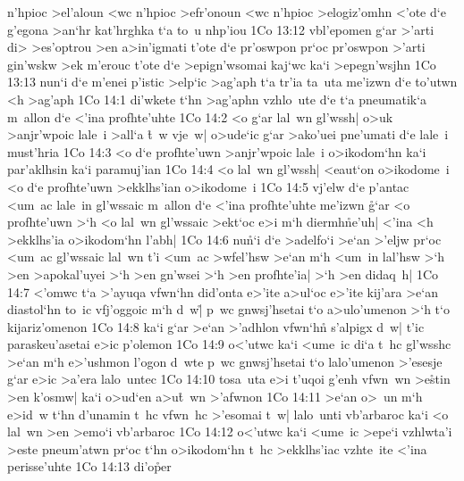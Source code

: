 n'hpioc
>el'aloun
<wc
n'hpioc
>efr'onoun
<wc
n'hpioc
>elogiz'omhn
<'ote
d`e
g'egona
>an`hr
kat'hrghka
t`a
to~u
nhp'iou\bibvsend
\vs 1Co 13:12
vbl'epomen
g`ar
>'arti
di>
>es'optrou
>en
a>in'igmati
t'ote
d`e
pr'oswpon
pr`oc
pr'oswpon
>'arti
gin'wskw
>ek
m'erouc
t'ote
d`e
>epign'wsomai
kaj`wc
ka`i
>epegn'wsjhn\bibvsend
\vs 1Co 13:13
nun`i
d`e
m'enei
p'istic
>elp`ic
>ag'aph
t`a
tr'ia
ta~uta
me'izwn
d`e
to'utwn
<h
>ag'aph\bibvsend
\vs 1Co 14:1
di'wkete
t`hn
>ag'aphn
vzhlo~ute
d`e
t`a
pneumatik`a
m~allon
d`e
<'ina
profhte'uhte\bibvsend
\vs 1Co 14:2
<o
g`ar
lal~wn
gl'wssh|
o>uk
>anjr'wpoic
lale~i
>all`a
\r{t}~w
vje~w|
o>ude`ic
g`ar
>ako'uei
pne'umati
d`e
lale~i
must'hria\bibvsend
\vs 1Co 14:3
<o
d`e
profhte'uwn
>anjr'wpoic
lale~i
o>ikodom`hn
ka`i
par'aklhsin
ka`i
paramuj'ian\bibvsend
\vs 1Co 14:4
<o
lal~wn
gl'wssh|
<eaut`on
o>ikodome~i
<o
d`e
profhte'uwn
>ekklhs'ian
o>ikodome~i\bibvsend
\vs 1Co 14:5
vj'elw
d`e
p'antac
<um~ac
lale~in
gl'wssaic
m~allon
d`e
<'ina
profhte'uhte
me'izwn
\r{g}`ar
<o
profhte'uwn
>`h
<o
lal~wn
gl'wssaic
>ekt`oc
e>i
m`h
diermh\r{n}e'uh|
<'ina
<h
>ekklhs'ia
o>ikodom`hn
l'abh|\bibvsend
\vs 1Co 14:6
nu\r{n}`i
d`e
>adelfo`i
>e`an
>'eljw
pr`oc
<um~ac
gl'wssaic
lal~wn
t'i
<um~ac
>wfel'hsw
>e`an
m`h
<um~in
lal'hsw
>`h
>en
>apokal'uyei
>`h
>en
gn'wsei
>`h
>en
profhte'ia|
>`h
>en
didaq~h|\bibvsend
\vs 1Co 14:7
<'omwc
t`a
>'ayuqa
vfwn`hn
did'onta
e>'ite
a>ul`oc
e>'ite
kij'ara
>e`an
diastol`hn
to~ic
vfj'oggoic
m`h
d~w|\r{}
p~wc
gnwsj'hsetai
t`o
a>ulo'umenon
>`h
t`o
kijariz'omenon\bibvsend
\vs 1Co 14:8
ka`i
g`ar
>e`an
>'adhlon
vfwn`hn\r{}
s'alpigx
d~w|
t'ic
paraskeu'asetai
e>ic
p'olemon\bibvsend
\vs 1Co 14:9
o<'utwc
ka`i
<ume~ic
di`a
t~hc
gl'wsshc
>e`an
m`h
e>'ushmon
l'ogon
d~wte
p~wc
gnwsj'hsetai
t`o
lalo'umenon
>'esesje
g`ar
e>ic
>a'era
lalo~untec\bibvsend
\vs 1Co 14:10
tosa~uta
e>i
t'uqoi
g'enh
vfwn~wn
>e\r{s}tin
>en
k'osmw|
ka`i
o>ud`en
a>u\r{t}~wn
>'afwnon\bibvsend
\vs 1Co 14:11
>e`an
o>~un
m`h
e>id~w
t`hn
d'unamin
t~hc
vfwn~hc
>'esomai
t~w|
lalo~unti
vb'arbaroc
ka`i
<o
lal~wn
>en
>emo`i
vb'arbaroc\bibvsend
\vs 1Co 14:12
o<'utwc
ka`i
<ume~ic
>epe`i
vzhlwta'i
>este
pneum'atwn
pr`oc
t`hn
o>ikodom`hn
t~hc
>ekklhs'iac
vzhte~ite
<'ina
perisse'uhte\bibvsend
\vs 1Co 14:13
di'o\r{p}er
